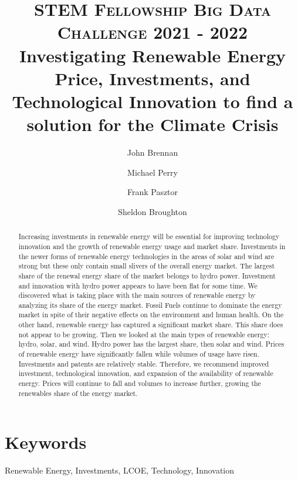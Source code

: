 \documentclass[10pt,twocolumn,letterpaper]{article}
\title{
		\usefont{OT1}{bch}{b}{n}
		\normalfont \normalsize \textsc{STEM Fellowship Big Data Challenge 2021 - 2022} \\ [10pt]
		\huge Investigating Renewable Energy Price, Investments, and Technological Innovation to find a solution for the Climate Crisis    \\
}
\author[]{John Brennan}
\author[]{Michael Perry}
\author[]{Frank Pasztor}
\author[]{Sheldon Broughton}
\affil[]{Neil McNeil Catholic High School}
\begin{document}
\maketitle

\begin{abstract}

Increasing investments in renewable energy will be essential for improving technology innovation and the growth of renewable energy usage and market share. Investments in the newer forms of renewable energy technologies in the areas of solar and wind are strong but these only contain small slivers of the overall energy market. The largest share of the renewal energy share of the market belongs to hydro power. Investment and innovation with hydro power appears to have been flat for some time. We discovered what is taking place with the main sources of renewable energy by analyzing its share of the energy market. Fossil Fuels continue to dominate the energy market  in spite of their negative effects on the environment and human health. On the other hand, renewable energy has captured a significant market share. This share does not appear to be growing. Then we looked at the main types of renewable energy: hydro, solar, and wind. Hydro power has the largest share, then solar and wind. Prices of renewable energy have significantly fallen while volumes of usage have risen. Investments and patents are relatively stable. Therefore, we recommend improved investment, technological innovation, and expansion of the availability of renewable energy. Prices will continue to fall and volumes to increase further, growing the renewables share of the energy market.   


\end{abstract} 

\section*{Keywords}
Renewable Energy, Investments, LCOE, Technology, Innovation 
\end{document}
